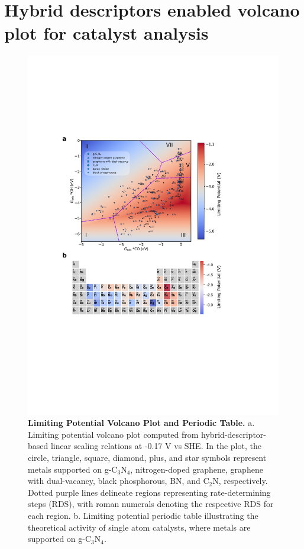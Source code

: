 

\section{Hybrid descriptors enabled volcano plot for catalyst analysis}


\begin{figure}
    \centering
    \includegraphics[width=0.95\linewidth]{main_fig3_volcano.JPG}
    \caption{\textbf{Limiting Potential Volcano Plot and Periodic Table.}
    a. Limiting potential volcano plot computed from hybrid-descriptor-based linear scaling relations at -0.17 V vs SHE.
    In the plot, the circle, triangle, square, diamond, plus, and star symbols represent metals supported on g-$\mathrm{C_3N_4}$, nitrogen-doped graphene, graphene with dual-vacancy, black phosphorous, BN, and $\mathrm{C_2N}$, respectively.
    Dotted purple lines delineate regions representing rate-determining steps (RDS), with roman numerals denoting the respective RDS for each region.
    b. Limiting potential periodic table illustrating the theoretical activity of single atom catalysts, where metals are supported on g-$\mathrm{C_3N_4}$.}
    \label{main_fig3:volcano}
\end{figure}


